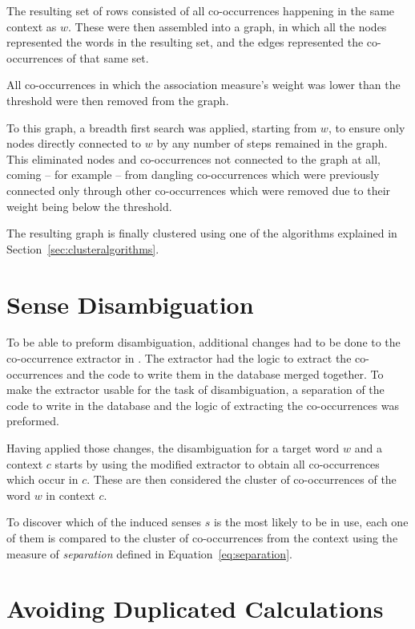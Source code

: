 The resulting set of rows consisted of all co-occurrences happening in the same
context as $w$. These were then assembled into a graph, in which all the nodes
represented the words in the resulting set, and the edges represented the
co-occurrences of that same set.

All co-occurrences in which the association measure's weight was lower than the
threshold were then removed from the graph.

To this graph, a breadth first search was applied, starting from $w$, to ensure
only nodes directly connected to $w$ by any number of steps remained in the
graph. This eliminated nodes and co-occurrences not connected to the graph at
all, coming -- for example -- from dangling co-occurrences which were previously
connected only through other co-occurrences which were removed due to their
weight being below the threshold.

The resulting graph is finally clustered using one of the algorithms explained
in Section~\ref{sec:clusteralgorithms}.

\section{Sense Disambiguation}

To be able to preform disambiguation, additional changes had to be done to the
co-occurrence extractor in \cite{correia2015syntax}. The extractor had the logic
to extract the co-occurrences and the code to write them in the database merged
together. To make the extractor usable for the task of disambiguation, a
separation of the code to write in the database and the logic of extracting the
co-occurrences was preformed.

Having applied those changes, the disambiguation for a target word $w$ and a
context $c$ starts by using the modified extractor to obtain all co-occurrences
which occur in $c$. These are then considered the cluster of co-occurrences of
the word $w$ in context $c$.

To discover which of the induced senses $s$ is the most likely to be in use,
each one of them is compared to the cluster of co-occurrences from the context
using the measure of \emph{separation} defined in Equation~\ref{eq:separation}.

\section{Avoiding Duplicated Calculations}

